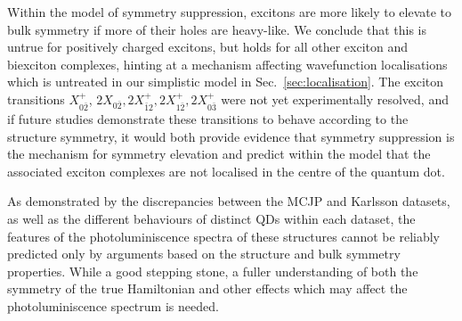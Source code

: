 Within the model of symmetry suppression, excitons are more likely to elevate to bulk symmetry if more of their holes are heavy-like. We conclude that this is untrue for positively charged excitons, but holds for all other exciton and biexciton complexes, hinting at a mechanism affecting wavefunction localisations which is untreated in our simplistic model in Sec.~\ref{sec:localisation}. The exciton transitions $X^+_{0\bar{2}}$, $2X_{0\bar{2}}, 2X^+_{\bar{1}2}, 2X^+_{1\bar{2}}, 2X^+_{0\bar{3}}$ were not yet experimentally resolved, and if future studies demonstrate these transitions to behave according to the structure symmetry, it would both provide evidence that symmetry suppression is the mechanism for symmetry elevation and predict within the model that the associated exciton complexes are not localised in the centre of the quantum dot.

As demonstrated by the discrepancies between the MCJP and Karlsson datasets, as well as the different behaviours of distinct QDs within each dataset, the features of the photoluminiscence spectra of these structures cannot be reliably predicted only by arguments based on the structure and bulk symmetry properties. While a good stepping stone, a fuller understanding of both the symmetry of the true Hamiltonian and other effects which may affect the photoluminiscence spectrum is needed.
